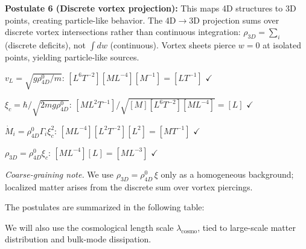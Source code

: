 \begin{tcolorbox}
\textbf{Postulate 6 (Discrete vortex projection):} This maps 4D structures to 3D points, creating particle-like behavior. The 4D$\to$3D projection sums over discrete vortex intersections rather than continuous integration: $\rho_{3D} = \sum_i$ (discrete deficits), not $\int dw$ (continuous). Vortex sheets pierce $w=0$ at isolated points, yielding particle-like sources.
\end{tcolorbox}

\begin{tcolorbox}[title=Dimensional Check]
$v_L = \sqrt{g \rho_{4D}^0 / m}$: $[L^6 T^{-2}] [M L^{-4}] [M^{-1}] = [L T^{-1}]$ $\checkmark$

$\xi_c = \hbar / \sqrt{2 m g \rho_{4D}^0}$: $[M L^2 T^{-1}] / \sqrt{[M] [L^6 T^{-2}] [M L^{-4}]} = [L]$ $\checkmark$

$\dot{M}_i = \rho_{4D}^0 \Gamma_i \xi_c^2$: $[M L^{-4}] [L^2 T^{-2}] [L^2] = [M T^{-1}]$ $\checkmark$

$\rho_{3D} = \rho_{4D}^0 \xi_c$: $[M L^{-4}] [L] = [M L^{-3}]$ $\checkmark$
\end{tcolorbox}
\noindent\textit{Coarse-graining note.} We use $\rho_{3D}=\rho_{4D}^0\,\xi$ only as a homogeneous background; localized matter arises from the discrete sum over vortex piercings.


The postulates are summarized in the following table:


We will also use the cosmological length scale $\lambda_{\text{cosmo}}$, tied to large-scale matter distribution and bulk-mode dissipation.

